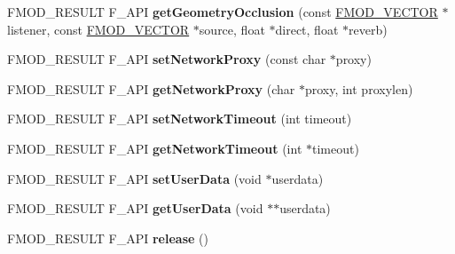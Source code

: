 \begin{DoxyCompactItemize}
\item 
\hypertarget{class_f_m_o_d_1_1_system_ac1c462ead8eef9cbb955a898cd1c64a9}{F\+M\+O\+D\+\_\+\+R\+E\+S\+U\+L\+T F\+\_\+\+A\+P\+I {\bfseries get\+Geometry\+Occlusion} (const \hyperlink{struct_f_m_o_d___v_e_c_t_o_r}{F\+M\+O\+D\+\_\+\+V\+E\+C\+T\+O\+R} $\ast$listener, const \hyperlink{struct_f_m_o_d___v_e_c_t_o_r}{F\+M\+O\+D\+\_\+\+V\+E\+C\+T\+O\+R} $\ast$source, float $\ast$direct, float $\ast$reverb)}\label{class_f_m_o_d_1_1_system_ac1c462ead8eef9cbb955a898cd1c64a9}

\item 
\hypertarget{class_f_m_o_d_1_1_system_ab1368bd2bd2bcba58d4c70c385277bd1}{F\+M\+O\+D\+\_\+\+R\+E\+S\+U\+L\+T F\+\_\+\+A\+P\+I {\bfseries set\+Network\+Proxy} (const char $\ast$proxy)}\label{class_f_m_o_d_1_1_system_ab1368bd2bd2bcba58d4c70c385277bd1}

\item 
\hypertarget{class_f_m_o_d_1_1_system_a6346a910caaff928a7498f2bfeaf8a69}{F\+M\+O\+D\+\_\+\+R\+E\+S\+U\+L\+T F\+\_\+\+A\+P\+I {\bfseries get\+Network\+Proxy} (char $\ast$proxy, int proxylen)}\label{class_f_m_o_d_1_1_system_a6346a910caaff928a7498f2bfeaf8a69}

\item 
\hypertarget{class_f_m_o_d_1_1_system_aad7cb557e4992666cfc304dfbac6d04e}{F\+M\+O\+D\+\_\+\+R\+E\+S\+U\+L\+T F\+\_\+\+A\+P\+I {\bfseries set\+Network\+Timeout} (int timeout)}\label{class_f_m_o_d_1_1_system_aad7cb557e4992666cfc304dfbac6d04e}

\item 
\hypertarget{class_f_m_o_d_1_1_system_aaabd940cb1f8768ae35bf68782d72ab6}{F\+M\+O\+D\+\_\+\+R\+E\+S\+U\+L\+T F\+\_\+\+A\+P\+I {\bfseries get\+Network\+Timeout} (int $\ast$timeout)}\label{class_f_m_o_d_1_1_system_aaabd940cb1f8768ae35bf68782d72ab6}

\item 
\hypertarget{class_f_m_o_d_1_1_system_ab2f36a02a4badbc4fc4727f37f62b7c3}{F\+M\+O\+D\+\_\+\+R\+E\+S\+U\+L\+T F\+\_\+\+A\+P\+I {\bfseries set\+User\+Data} (void $\ast$userdata)}\label{class_f_m_o_d_1_1_system_ab2f36a02a4badbc4fc4727f37f62b7c3}

\item 
\hypertarget{class_f_m_o_d_1_1_system_a04c439bfbbfa385ce819b29b26584fc5}{F\+M\+O\+D\+\_\+\+R\+E\+S\+U\+L\+T F\+\_\+\+A\+P\+I {\bfseries get\+User\+Data} (void $\ast$$\ast$userdata)}\label{class_f_m_o_d_1_1_system_a04c439bfbbfa385ce819b29b26584fc5}

\item 
\hypertarget{class_f_m_o_d_1_1_system_aa7ac27bd5b475d40b6ca4b3b93a9351d}{F\+M\+O\+D\+\_\+\+R\+E\+S\+U\+L\+T F\+\_\+\+A\+P\+I {\bfseries release} ()}\label{class_f_m_o_d_1_1_system_aa7ac27bd5b475d40b6ca4b3b93a9351d}


\end{DoxyCompactItemize}
